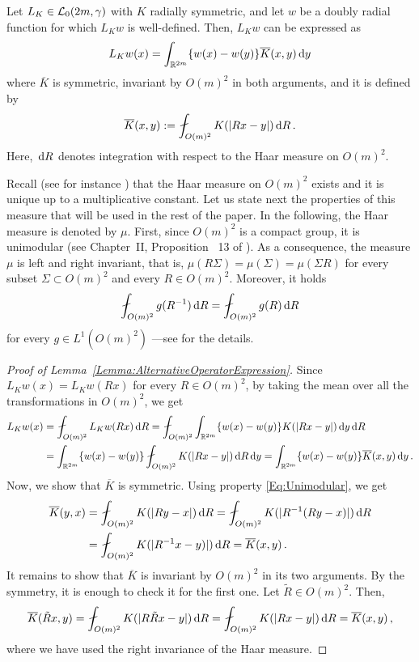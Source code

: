 \begin{lemma} \label{Lemma:AlternativeOperatorExpression}
Let $L_K \in \mathcal{L}_0(2m,\gamma)$ with $K$ radially symmetric, and let $w$ be a doubly radial function for which $L_K w$ is well-defined. Then, $L_K w$ can be expressed as
$$
L_K w(x) = \int_{\mathbb{R}^{2m}} \{w(x) - w(y)\} \overline{K}(x,y) \,\mathrm{d} y
$$
where $\overline{K}$ is symmetric, invariant by $O(m)^2$ in both arguments, and it is defined by
\begin{equation*}
\overline{K}(x,y) := \average_{O(m)^2} K(|Rx - y|)\d R\,.
\end{equation*}
Here, $\,\mathrm{d} R$ denotes integration with respect to the Haar measure on $O(m)^2$.
\end{lemma}

Recall (see for instance \cite{Nachbin}) that the Haar measure on $O(m)^2$ exists and it is unique up to a
multiplicative constant. Let us state next the properties of this measure that will be used in the rest of the
paper. In the following, the Haar measure is denoted by $\mu$. First, since $O(m)^2$ is a compact
group, it is unimodular (see Chapter~II, Proposition~ 13 of \cite{Nachbin}). As a consequence, the
measure $\mu$ is left and right invariant, that is, $\mu(R\Sigma) = \mu(\Sigma) = \mu(\Sigma R) $
for every subset $\Sigma \subset O(m)^2$ and every $R\in O(m)^2$. Moreover, it holds
\begin{equation}
\label{Eq:Unimodular}
\average_{O(m)^2} g(R^{-1}) \d R = \average_{O(m)^2} g(R) \d R
\end{equation}	
for every $g\in L^1(O(m)^2)$ ---see \cite{Nachbin} for the details.

\begin{proof}[Proof of Lemma~\ref{Lemma:AlternativeOperatorExpression}]
Since $L_K w (x) = L_K w (Rx)$ for every $R\in O(m)^2$, by taking the mean over all the transformations in $O(m)^2$, we get
\begin{align*}
L_K w(x) &= \average_{O(m)^2} L_K w(Rx)\d R =  \average_{O(m)^2} \int_{\R^{2m}} \{w(x) - w(y)\}K(|Rx - y|) \d y \d R\\
&= \int_{\R^{2m}} \{w(x) - w(y)\}  \average_{O(m)^2} K(|Rx - y|) \d R  \d y = \int_{\R^{2m}} \{w(x) - w(y)\}  \overline{K}(x,y) \d y\,.
\end{align*}
Now, we show that $\overline{K}$ is symmetric. Using property \eqref{Eq:Unimodular}, we get
\begin{align*}
\overline{K}(y,x) &= \average_{O(m)^2} K(|R y - x|)\d R = \average_{O(m)^2} K(|R^{-1} (R y - x)|)\d R \\
&= \average_{O(m)^2} K(|R^{-1}x-y)|)\d R = \overline{K}(x,y)\,.
\end{align*}
It remains to show that
$\overline{K}$ is invariant by $O(m)^2$ in its two arguments. By the symmetry, it is enough to
check it for the first one. Let $\tilde{R} \in O(m)^2$. Then,
$$
\overline{K} (\tilde{R}x, y) = \average_{O(m)^2} K(|R \tilde{R} x - y|)\d R  = \average_{O(m)^2} K(|R x - y|)\d R = \overline{K} (x, y)\,,
$$
where we have used the right invariance of the Haar measure.
\end{proof}



